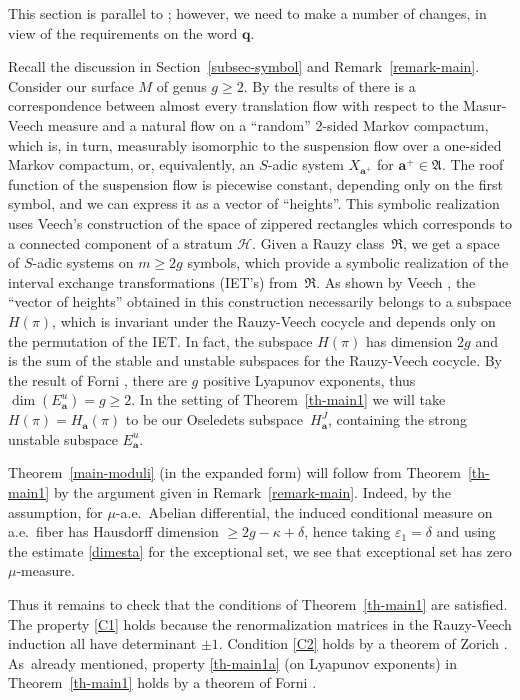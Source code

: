 \documentclass[11pt]{article}
\numberwithin{equation}{section}\newcommand{\Relation}[2][]{}\newtheorem*{prop*}{Proposition}
\let\mathcal\mathscr
\let\epsilon\varepsilon
\theoremstyle{plain}
\theoremstyle{definition}
\newcommand\bom{{\boldsymbol a}}\let\ba\bom
\newcommand\bq{{\boldsymbol q}}
\newcommand\FrA{\mathfrak{A}}
\newcommand\FrR{\mathfrak{R}}
\newcommand\Hk{\mathcal{H}}
\begin{document}
This section is parallel to \cite[\S11]{BuSo18a}; however, we need to make a number of changes, in view of the requirements on the word $\bq$.

Recall the discussion in Section~\ref{subsec-symbol} and Remark~\ref{remark-main}.
Consider our surface $M$ of genus $g\ge 2$. By the results of \cite[\S4]{Buf-umn} there is a correspondence between almost every translation flow with respect to the Masur-Veech measure and a natural flow on a ``random'' 2-sided Markov compactum, which is, in turn, measurably isomorphic to the suspension flow over a one-sided Markov compactum, or, equivalently, an $S$-adic system $X_{\bom^+}$ for $\bom^+\in \FrA$. The roof function of the suspension flow is piecewise constant, depending only on the first symbol, and we can express it as a vector of ``heights''. This symbolic realization uses Veech's construction \cite{veech} of the space of zippered rectangles which corresponds to a connected component of a stratum $\Hk$. Given a Rauzy class~$\FrR$, we get a space of $S$-adic systems on $m\ge 2g$ symbols, which provide a symbolic realization of the interval exchange transformations (IET's) from~$\FrR$. As shown by Veech \cite{veechamj}, the ``vector of heights'' obtained in this construction necessarily belongs to a subspace $H(\pi)$, which is invariant under the Rauzy-Veech cocycle and depends only on the permutation of the IET. In fact, the subspace $H(\pi)$ has dimension $2g$ and is the sum of the stable and unstable subspaces for the Rauzy-Veech cocycle. By the result of Forni \cite{Forni}, there are $g$ positive Lyapunov exponents, thus $\dim(E^u_\bom)=g\ge 2$. In the setting of Theorem~\ref{th-main1} we will take $H(\pi) = H_\bom(\pi)$ to be our Oseledets subspace~$H^J_\bom$, containing the strong unstable subspace $E^u_\bom$.

Theorem~\ref{main-moduli} (in the expanded form) will follow from Theorem~\ref{th-main1} by the argument given in Remark~\ref{remark-main}. Indeed, by the assumption, for $\mu$-a.e.\ Abelian differential, the induced conditional measure on a.e.\ fiber has Hausdorff dimension $\ge 2g-\kappa + \delta$, hence taking $\epsilon_1=\delta$ and using the estimate \eqref{dimesta} for the exceptional set, we see that exceptional set has zero $\mu$-measure.

Thus it remains to check that the conditions of Theorem~\ref{th-main1} are satisfied. The property \eqref{C1} holds because the renormalization matrices in the Rauzy-Veech induction all have determinant $\pm 1$. Condition \eqref{C2} holds by a theorem of Zorich \cite{Zorich}. As~already mentioned, property \eqref{th-main1a} (on Lyapunov exponents) in Theorem~\ref{th-main1} holds by a theorem of Forni \cite{Forni}.
\end{document}
